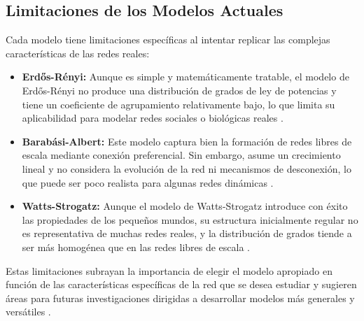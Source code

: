 \subsection{Limitaciones de los Modelos Actuales}

Cada modelo tiene limitaciones específicas al intentar replicar las complejas características de las redes reales:

\begin{itemize}
    \item \textbf{Erdős-Rényi:} Aunque es simple y matemáticamente tratable, el modelo de Erdős-Rényi no produce una distribución de grados de ley de potencias y tiene un coeficiente de agrupamiento relativamente bajo, lo que limita su aplicabilidad para modelar redes sociales o biológicas reales .
    \item \textbf{Barabási-Albert:} Este modelo captura bien la formación de redes libres de escala mediante conexión preferencial. Sin embargo, asume un crecimiento lineal y no considera la evolución de la red ni mecanismos de desconexión, lo que puede ser poco realista para algunas redes dinámicas .
    \item \textbf{Watts-Strogatz:} Aunque el modelo de Watts-Strogatz introduce con éxito las propiedades de los pequeños mundos, su estructura inicialmente regular no es representativa de muchas redes reales, y la distribución de grados tiende a ser más homogénea que en las redes libres de escala .
\end{itemize}

Estas limitaciones subrayan la importancia de elegir el modelo apropiado en función de las características específicas de la red que se desea estudiar y sugieren áreas para futuras investigaciones dirigidas a desarrollar modelos más generales y versátiles .
